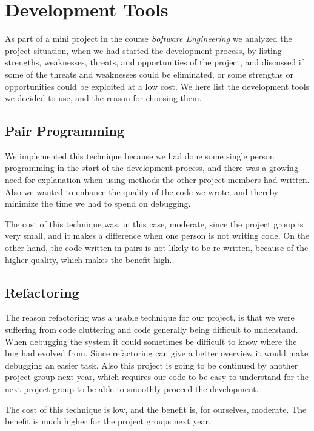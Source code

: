 \chapter{Development Tools}
	\label{cha:development_tools}
	As part of a mini project in the course \textit{Software Engineering} we analyzed the project situation, when we had started the development process, by listing strengths, weaknesses, threats, and opportunities of the project, and discussed if some of the threats and weaknesses could be eliminated, or some strengths or opportunities could be exploited at a low cost. We here list the development tools we decided to use, and the reason for choosing them.
	
	\section*{Pair Programming}
		We implemented this technique because we had done some single person programming in the start of the development process, and there was a growing need for explanation when using methods the other project members had written. Also we wanted to enhance the quality of the code we wrote, and thereby minimize the time we had to spend on debugging.

The cost of this technique was, in this case, moderate, since the project group is very small, and it makes a difference when one person is not writing code. On the other hand, the code written in pairs is not likely to be re-written, because of the higher quality, which makes the benefit high.
	
	\section*{Refactoring}
	The reason refactoring was a usable technique for our project, is that we were suffering from code cluttering and code generally being difficult to understand. When debugging the system it could sometimes be difficult to know where the bug had evolved from. Since refactoring can give a better overview it would make debugging an easier task. Also this project is going to be continued by another project group next year, which requires our code to be easy to understand for the next project group to be able to smoothly proceed the development.

The cost of this technique is low, and the benefit is, for ourselves, moderate. The benefit is much higher for the project groups next year.